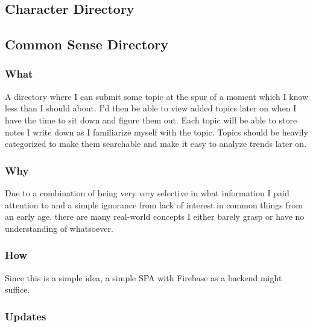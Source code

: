 \documentclass{article}[2017/07/09]
\begin{document}
  \subsection{Character Directory}

  \subsection{Common Sense Directory}
    \subsubsection{What}
      A directory where I can submit some topic at the spur of a moment which I know less than I should about. I'd then be able to view added topics later on when I have the time to sit down and figure them out.
      Each topic will be able to store notes I write down as I familiarize myself with the topic. Topics should be heavily categorized to make them searchable and make it easy to analyze trends later on.
    \subsubsection{Why}
      Due to a combination of being very very selective in what information I paid attention to and a simple ignorance from lack of interest in common things
      from an early age, there are many real-world concepts I either barely grasp or have no understanding of whatsoever.
    \subsubsection{How}
      Since this is a simple idea, a simple SPA with Firebase as a backend might suffice.
    \subsubsection{Updates}
\end{document}
